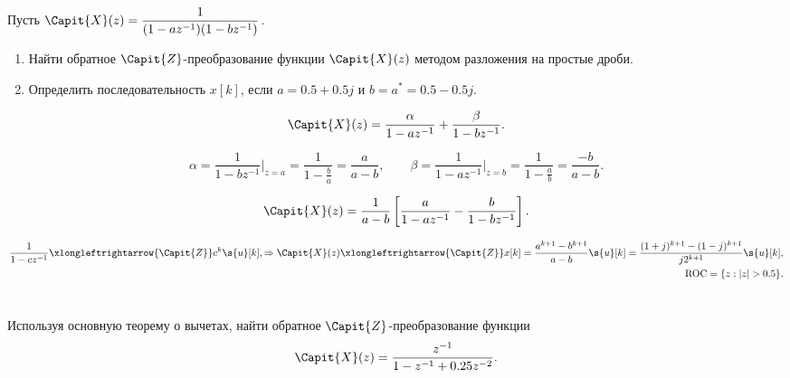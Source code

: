 \protect\thispagestyle{fancy}
\section{}
Пусть $\Capit{X}(z) = \dfrac{1}{(1 - az^{-1})(1 - bz^{-1})}$.
\begin{enumerate}[label=(\alph*)]
	\item Найти обратное $\Capit{Z}$-преобразование функции $\Capit{X}(z)$ методом разложения на простые дроби.
	\item Определить последовательность $x[k]$, если $a = 0.5 + 0.5j$ и $b = a^* = 0.5 - 0.5j$.
\end{enumerate}

\begin{equation*}
	\Capit{X}(z) = \dfrac{\alpha}{1 - az^{-1}} + \dfrac{\beta}{1 - bz^{-1}}.
\end{equation*}

\begin{equation*}
	\alpha  = \dfrac{1}{1 - bz^{-1}}\Big|_{z = a} = \dfrac{1}{1 - \frac{b}{a}} = \dfrac{a}{a - b}, \qquad
	\beta  = \dfrac{1}{1 - az^{-1}}\Big|_{z = b} = \dfrac{1}{1 - \frac{a}{b}} = \dfrac{-b}{a - b}.
\end{equation*}

\begin{equation*}
	\Capit{X}(z) = \dfrac{1}{a - b} \left[ \dfrac{a}{1 - az^{-1}} - \dfrac{b}{1 - bz^{-1}} \right].
\end{equation*}

\begin{align*}
	\dfrac{1}{1 - cz^{-1}} \xlongleftrightarrow{\Capit{Z}} c^k \s{u}[k], \Rightarrow
	\Capit{X}(z) \xlongleftrightarrow{\Capit{Z}} 
	x[k] = \dfrac{ a^{k+1} - b^{k+1}}{a - b}\s{u}[k] = \dfrac{(1 + j)^{k+1} - (1 - j)^{k+1}}{j2^{k+1}} \s{u}[k],\\
	\text{ROC} = \{z: |z| > 0.5\}.
\end{align*}

\section{}
Используя основную теорему о вычетах, найти обратное $\Capit{Z}$-преобразование функции
\begin{equation*}
	\Capit{X}(z) = \dfrac{z^{-1}}{1 - z^{-1} + 0.25z^{-2}}.
\end{equation*}

